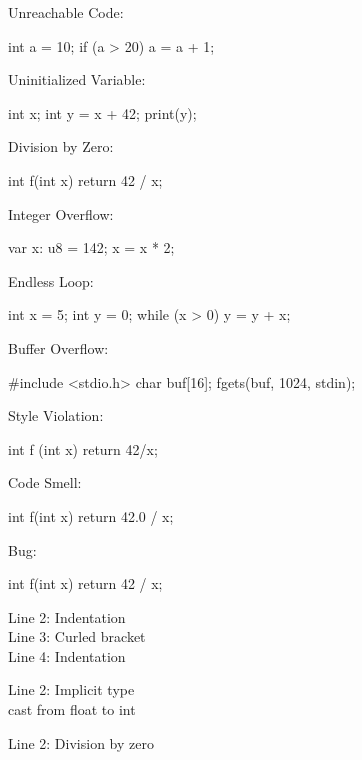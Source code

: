\documentclass{article}
\begin{document}
\begin{pptWide}{3}
Unreachable Code:
{\small\begin{ffcode}
int a = 10;
if (a > 20) {
  a = a + 1;
}
\end{ffcode}
}\par
Uninitialized Variable:\par
{\small\begin{ffcode}
int x;
int y = x + 42;
print(y);
\end{ffcode}
}

\par\columnbreak\par
Division by Zero:\par
{\small\begin{ffcode}
int f(int x) {
  return 42 / x;
}
\end{ffcode}
}\par
Integer Overflow:\par
{\small\begin{ffcode}
var x: u8 = 142;
x = x * 2;
\end{ffcode}
}
\par\columnbreak\par
Endless Loop:
{\small\begin{ffcode}
int x = 5;
int y = 0;
while (x > 0) {
  y = y + x;
}
\end{ffcode}
}\par
Buffer Overflow:
{\small\begin{ffcode}
#include <stdio.h>
char buf[16];
fgets(buf, 1024, stdin);
\end{ffcode}
}
\end{pptWide}
\plush{}

\begin{multicols}{3}
Style Violation:
{\small\begin{ffcode}
int f
  (int x)
{
     return 42/x;
}
\end{ffcode}
}
\par\columnbreak\par
Code Smell:\par
{\small\begin{ffcode}
int f(int x) {
  return 42.0 / x;
}
\end{ffcode}
}
\par\columnbreak\par
Bug:\par
{\small\begin{ffcode}
int f(int x) {
  return 42 / x;
}
\end{ffcode}
}
\end{multicols}
{\scriptsize\color{red}\ttfamily\begin{multicols}{3}
Line 2: Indentation \\
Line 3: Curled bracket \\
Line 4: Indentation
\par\columnbreak\par
Line 2: Implicit type \\
cast from float to int
\par\columnbreak\par
Line 2: Division by zero
\end{multicols}}
\plush{}
\end{document}
